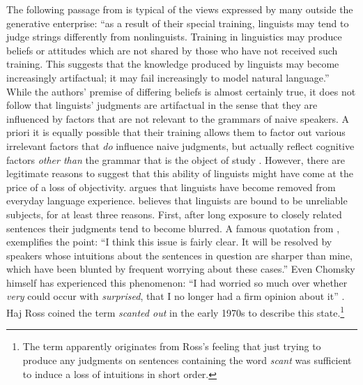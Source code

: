 The following passage from \citet[968]{BradacEtAl1980} is typical of the views expressed by many outside the generative enterprise: ``as a result of their special training, linguists may tend to judge strings differently from nonlinguists. Training in linguistics may produce beliefs or attitudes which are not shared by those who have not received such training. This suggests that the knowledge produced by linguists may become increasingly artifactual; it may fail increasingly to model natural language.'' While the authors' premise of differing beliefs is almost certainly true, it does not follow that linguists' judgments are artifactual in the sense that they are influenced by factors that are not relevant to the grammars of naive speakers. A priori it is equally possible that their training allows them to factor out various irrelevant factors that \textit{do} influence naive judgments, but actually reflect cognitive factors \textit{other than} the grammar that is the object of study \citep{Levelt1974}. However, there are legitimate reasons to suggest that this ability of linguists might have come at the price of a loss of objectivity. \citet{Labov1972a} argues that linguists have become removed from everyday language experience. \citet{Greenbaum1976a,Greenbaum1977c} believes that linguists are bound to be unreliable subjects, for at least three reasons. First, after long exposure to closely related sentences their judgments tend to become blurred. A famous quotation from \citet[178]{Fraser1971}, exemplifies the point: ``I think this issue is fairly clear. It will be resolved by speakers whose intuitions about the sentences in question are sharper than mine, which have been blunted by frequent worrying about these cases.'' Even Chomsky himself has experienced this phenomenon: ``I had worried so much over whether \textit{very} could occur with \textit{surprised}, that I no longer had a firm opinion about it'' \citep[172]{Chomsky1962}. Haj Ross coined the term \textit{scanted out} in the early 1970s to describe this state.\footnote{The term apparently originates from Ross's feeling that just trying to produce any judgments on sentences containing the word \textit{scant} was sufficient to induce a loss of intuitions in short order.}
